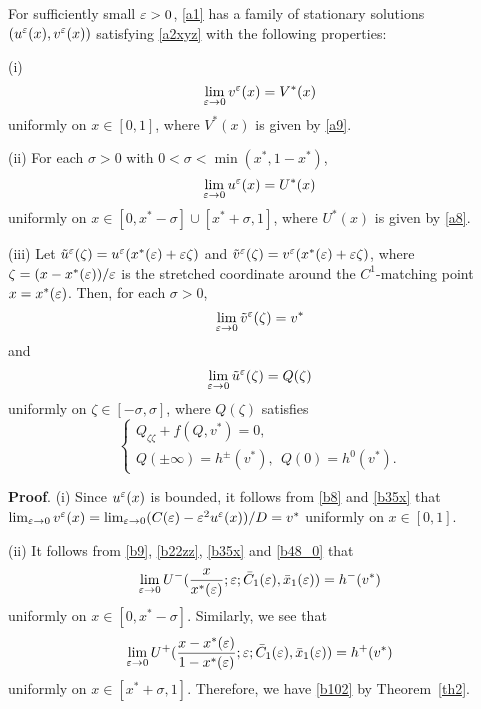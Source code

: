 \documentclass[a4,10pt]{article}
\begin{document}
\begin{cor}\label{cor1} \rm
For sufficiently small $\varepsilon >0$, \eqref{a1} has a family of  stationary solutions $(u^\varepsilon(x), v^\varepsilon(x))$ 
satisfying \eqref{a2xyz} with the following properties:

\no (i)
\begin{equation}\label{b101}
\displaystyle\lim_{\varepsilon \to 0} v^\varepsilon(x) = V^*(x) 
\end{equation}
uniformly on $x \in [0, 1]$, where $V^*(x)$ is given by \eqref{a9}.

\no (ii)
For each $\sigma > 0$ with $ 0 < \sigma < \min(x^*, 1-x^*)$, 
\begin{equation}\label{b102}
\displaystyle\lim_{\varepsilon \to 0} u^\varepsilon(x) = U^*(x) 
\end{equation}
uniformly on $x \in [0, x^* - \sigma] \cup [x^* + \sigma, 1]$,
where $U^*(x)$ is given by \eqref{a8}.

\no (iii) Let 
$\tilde{u}^\varepsilon(\zeta) = u^\varepsilon(x^*(\varepsilon)+\varepsilon \zeta)$ and 
$\tilde{v}^\varepsilon(\zeta) = v^\varepsilon(x^*(\varepsilon)+\varepsilon \zeta)$, where
$\zeta = (x - x^*(\varepsilon))/\varepsilon$ is the stretched coordinate around the $C^1$-matching point 
$x = x^*(\varepsilon)$. Then, for each $\sigma > 0$, 
%
\[%
\dis\lim_{\ep \to 0} \tilde{v}^\ep(\zeta) = v^*
\]%
%
and
%
\[%
\dis\lim_{\ep \to 0} \tilde{u}^\ep(\zeta) = Q(\zeta)
\]%
%
uniformly on $\zeta \in [- \sigma, \sigma]$, where $Q(\zeta)$ satisfies
%
%
\begin{equation}\label{b103y}
\left \{
\begin{array}{l}
Q_{\zeta \zeta} + f( Q, v^*) = 0, \\[1ex]
Q(\pm \infty) = h^{\pm}(v^*), \ \ Q(0) = h^0(v^*). 
\end{array} 
\right.
\end{equation}
\end{cor}

{\bf Proof}. (i) Since $u^\varepsilon(x)$ is bounded, it follows from \eqref{b8} and \eqref{b35x} that
$\lim_{\varepsilon \to 0} v^\varepsilon(x) = \lim_{\varepsilon \to 0} (C(\varepsilon) - \varepsilon^2 u^\varepsilon(x))/D = v^*$
uniformly on $x \in [0, 1]$. 

\no
(ii) It follows from \eqref{b9}, \eqref{b22zz}, \eqref{b35x} and \eqref{b48_0} that
$$
\lim_{\varepsilon \to 0} U^-(\frac x{x^*(\varepsilon)};\varepsilon;  \bar{C}_1(\varepsilon), \bar{x}_1(\varepsilon)) = h^-(v^*)
$$
uniformly on $x \in [0, x^* - \sigma]$. Similarly, we see that
$$
\lim_{\varepsilon \to 0} U^+(\frac {x-x^*(\varepsilon)}{1-x^*(\varepsilon)};\varepsilon; \bar{C}_1(\varepsilon), \bar{x}_1(\varepsilon)) 
= h^+(v^*)
$$
uniformly on $x \in [x^* + \sigma, 1]$. Therefore, we have
\eqref{b102} by Theorem~\ref{th2}.
\end{document}

